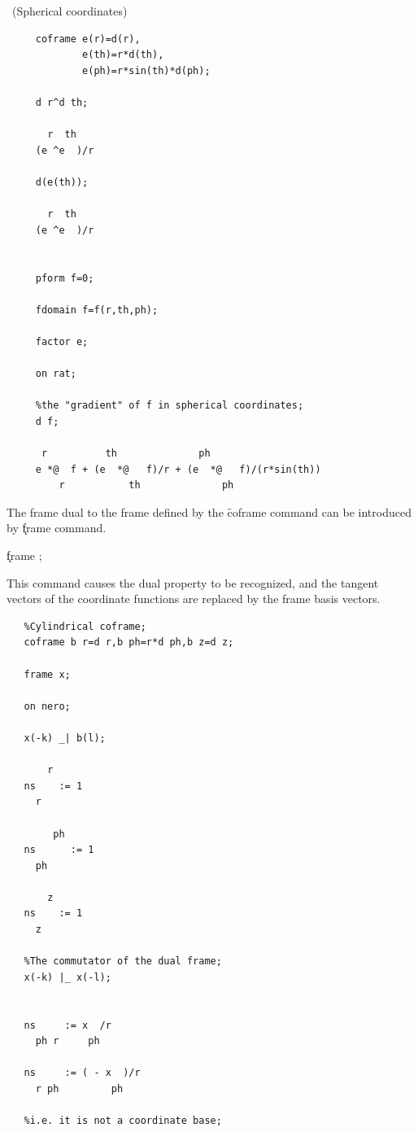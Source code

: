 \example\ (Spherical coordinates)

\begin{verbatim}
     coframe e(r)=d(r),
             e(th)=r*d(th),
             e(ph)=r*sin(th)*d(ph);

     d r^d th;

       r  th
     (e ^e  )/r

     d(e(th));

       r  th
     (e ^e  )/r


     pform f=0;

     fdomain f=f(r,th,ph);

     factor e;

     on rat;

     %the "gradient" of f in spherical coordinates;
     d f;

      r          th              ph
     e *@  f + (e  *@   f)/r + (e  *@   f)/(r*sin(th))
         r           th              ph
\end{verbatim}

The frame dual to the frame defined by the \f{coframe} command can
be introduced by \k{frame} command. 
\hypertarget{command:FRAME}{}

\hspace*{2em} \k{frame} ;\label{FRAME}

This command causes the
dual property to be recognized, and the tangent vectors of the
coordinate functions are replaced by the frame basis vectors.

\example{}

\begin{verbatim}
   %Cylindrical coframe;
   coframe b r=d r,b ph=r*d ph,b z=d z;

   frame x;

   on nero;

   x(-k) _| b(l);

       r
   ns    := 1
     r

        ph
   ns      := 1
     ph

       z
   ns    := 1
     z

   %The commutator of the dual frame;
   x(-k) |_ x(-l);


   ns     := x  /r
     ph r     ph

   ns     := ( - x  )/r
     r ph         ph

   %i.e. it is not a coordinate base;
\end{verbatim}

